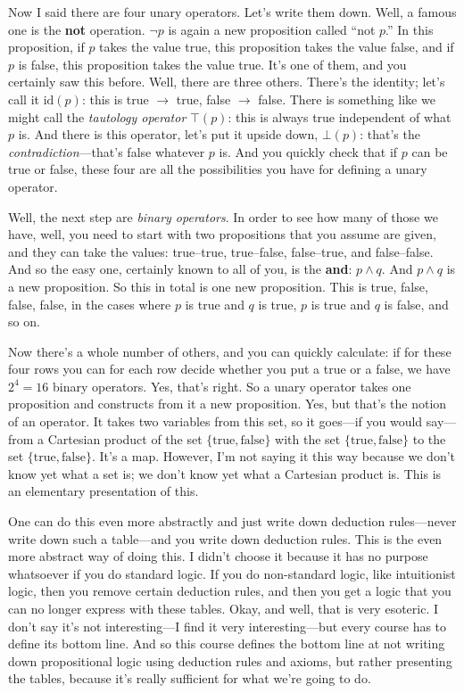 Now I said there are four unary operators. Let's write them down. Well, a famous one is the \textbf{not} operation. $\lnot p$ is again a new proposition called ``not $p$.'' In this proposition, if $p$ takes the value true, this proposition takes the value false, and if $p$ is false, this proposition takes the value true. It's one of them, and you certainly saw this before. Well, there are three others. There's the identity; let's call it $\mathrm{id}(p)$: this is true $\to$ true, false $\to$ false. There is something like we might call the \emph{tautology operator} $\top(p)$: this is always true independent of what $p$ is. And there is this operator, let's put it upside down, $\bot(p)$: that's the \emph{contradiction}---that's false whatever $p$ is. And you quickly check that if $p$ can be true or false, these four are all the possibilities you have for defining a unary operator.

Well, the next step are \emph{binary operators}. In order to see how many of those we have, well, you need to start with two propositions that you assume are given, and they can take the values: true--true, true--false, false--true, and false--false. And so the easy one, certainly known to all of you, is the \textbf{and}: $p \land q$. And $p \land q$ is a new proposition. So this in total is one new proposition. This is true, false, false, false, in the cases where $p$ is true and $q$ is true, $p$ is true and $q$ is false, and so on.

Now there's a whole number of others, and you can quickly calculate: if for these four rows you can for each row decide whether you put a true or a false, we have $2^4 = 16$ binary operators. Yes, that's right. So a unary operator takes one proposition and constructs from it a new proposition. Yes, but that's the notion of an operator. It takes two variables from this set, so it goes---if you would say---from a Cartesian product of the set $\{\text{true}, \text{false}\}$ with the set $\{\text{true}, \text{false}\}$ to the set $\{\text{true}, \text{false}\}$. It's a map. However, I'm not saying it this way because we don't know yet what a set is; we don't know yet what a Cartesian product is. This is an elementary presentation of this.

One can do this even more abstractly and just write down deduction rules---never write down such a table---and you write down deduction rules. This is the even more abstract way of doing this. I didn't choose it because it has no purpose whatsoever if you do standard logic. If you do non-standard logic, like intuitionist logic, then you remove certain deduction rules, and then you get a logic that you can no longer express with these tables. Okay, and well, that is very esoteric. I don't say it's not interesting---I find it very interesting---but every course has to define its bottom line. And so this course defines the bottom line at not writing down propositional logic using deduction rules and axioms, but rather presenting the tables, because it's really sufficient for what we're going to do.

